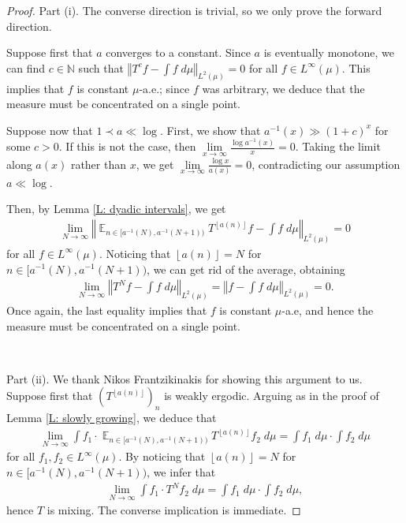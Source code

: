 \documentclass[11pt]{amsart}
\theoremstyle{definition}
\DeclareMathOperator*{\E}{\mathbb{E}}
\newcommand{\N}{{\mathbb N}}
\newcommand{\norm}[1]{\left\Vert #1\right\Vert}
\newcommand{\inv}{^{-1}}
\newcommand{\1}{{\mathbf{1}}}
\newcommand{\floor}[1]{{\left \lfloor #1 \right \rfloor}}
\begin{document}
\begin{proof}
Part (i). The converse direction is trivial, so we only prove the forward direction.

Suppose first that $a$ converges to a constant. Since $a$ is eventually monotone, we can find $c\in\N$ such that $\norm{T^c f - \int f\; d\mu}_{L^2(\mu)} = 0$ for all $f\in L^\infty(\mu)$. This implies that $f$ is constant $\mu$-a.e.; since $f$ was arbitrary, we deduce that the measure must be concentrated on a single point.


Suppose now that $1\prec a\ll\log$. First, we show that $a\inv(x)\gg (1+c)^x$ for some $c>0$. If this is not the case, then $\lim\limits_{x\to\infty}\frac{\log a\inv(x)}{x} = 0$. Taking the limit along $a(x)$ rather than $x$, we get $\lim\limits_{x\to\infty} \frac{\log x}{a(x)}=0$, contradicting our assumption $a\ll \log$.

Then, by Lemma \ref{L: dyadic intervals}, we get 
\begin{align*}
    \lim_{N\to\infty}\norm{\E_{n\in[a\inv(N), a\inv(N+1))}T^{\floor{a(n)}}f-\int f\; d\mu}_{L^2(\mu)} = 0
\end{align*}
for all $f\in L^\infty(\mu)$. Noticing that $\floor{a(n)} = N$ for $n\in [a\inv(N), a\inv(N+1))$, we can get rid of the average, obtaining
\begin{align*}
     \lim_{N\to\infty}\norm{T^N f-\int f\; d\mu}_{L^2(\mu)} = \norm{f-\int f\; d\mu}_{L^2(\mu)} = 0.
\end{align*}
Once again, the last equality implies that $f$ is constant $\mu$-a.e, and hence the measure must be concentrated on a single point.

\

Part (ii). We thank Nikos Frantzikinakis for showing this argument to us. Suppose first that $(T^{\floor{a(n)}})_n$ is weakly ergodic. Arguing as in the proof of Lemma \ref{L: slowly growing}, we deduce that
\begin{align*}
    \lim_{N\to\infty}\int f_1\cdot \E_{n\in[a\inv(N), a\inv(N+1))}T^{\floor{a(n)}}f_2\; d\mu = \int f_1\; d\mu\cdot \int f_2\; d\mu
\end{align*}
for all $f_1,f_2\in L^\infty(\mu)$. By noticing that $\floor{a(n)} = N$ for $n\in [a\inv(N), a\inv(N+1))$, we infer that
\begin{align*}
    \lim_{N\to\infty}\int f_1\cdot T^N f_2\; d\mu = \int f_1\; d\mu\cdot \int f_2\; d\mu,
\end{align*}
hence $T$ is mixing. The converse implication is immediate. 
\end{proof}
\end{document}
